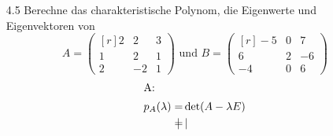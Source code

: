 \documentclass{HM}
\begin{document}
\begin{enumerate}
	\item[4.5] Berechne das charakteristische Polynom, die Eigenwerte und Eigenvektoren von
	$$A=\begin{pmatrix*}[r]
		2&2&3\\
		1&2&1\\
		2&-2&1
	\end{pmatrix*} \text{ und } B=\begin{pmatrix*}[r]
		-5&0&7\\
		6&2&-6\\
		-4&0&6
	\end{pmatrix*}$$
	\begin{align*}
		\intertext{A:}
		p_A(\lambda)=&\det(A -\lambda E)\\
		=&\begin{vmatrix}

\end{vmatrix}
\end{align*}
\end{enumerate}
\end{document}
